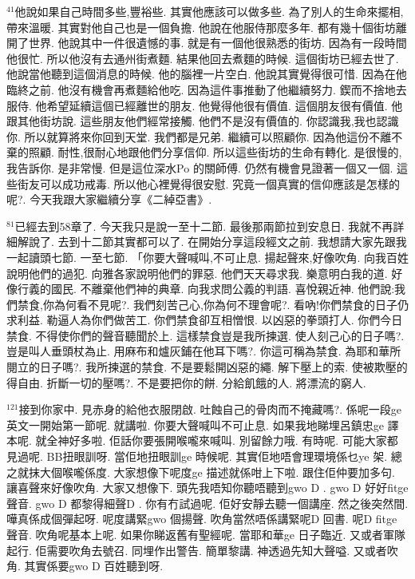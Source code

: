 \documentclass{book}
\begin{document}
$^{41}$他說如果自己時間多些,豐裕些.
其實他應該可以做多些.
為了別人的生命來擺相,帶來溫暖.
其實對他自己也是一個負擔.
他說在他服侍那麼多年.
都有幾十個街坊離開了世界.
他說其中一件很遺憾的事.
就是有一個他很熟悉的街坊.
因為有一段時間他很忙.
所以他沒有去通州街煮麵.
結果他回去煮麵的時候.
這個街坊已經去世了.
他說當他聽到這個消息的時候.
他的腦裡一片空白.
他說其實覺得很可惜.
因為在他臨終之前.
他沒有機會再煮麵給他吃.
因為這件事推動了他繼續努力.
鍥而不捨地去服侍.
他希望延續這個已經離世的朋友.
他覺得他很有價值.
這個朋友很有價值.
他跟其他街坊說.
這些朋友他們經常接觸.
他們不是沒有價值的.
你認識我,我也認識你.
所以就算將來你回到天堂.
我們都是兄弟.
繼續可以照顧你.
因為他這份不離不棄的照顧.
耐性,很耐心地跟他們分享信仰.
所以這些街坊的生命有轉化.
是很慢的,我告訴你.
是非常慢.
但是這位深水Po 的關師傅.
仍然有機會見證著一個又一個.
這些街友可以成功戒毒.
所以他心裡覺得很安慰.
究竟一個真實的信仰應該是怎樣的呢?.
今天我跟大家繼續分享《二綽亞書》.

$^{81}$已經去到58章了.
今天我只是說一至十二節.
最後那兩節拉到安息日.
我就不再詳細解說了.
去到十二節其實都可以了.
在開始分享這段經文之前.
我想請大家先跟我一起讀頭七節.
一至七節.
「你要大聲喊叫,不可止息.
揚起聲來,好像吹角.
向我百姓說明他們的過犯.
向雅各家說明他們的罪惡.
他們天天尋求我.
樂意明白我的道.
好像行義的國民.
不離棄他們神的典章.
向我求問公義的判語.
喜悅親近神.
他們說:我們禁食,你為何看不見呢?.
我們刻苦己心,你為何不理會呢?.
看吶!你們禁食的日子仍求利益.
勒逼人為你們做苦工.
你們禁食卻互相憎恨.
以凶惡的拳頭打人.
你們今日禁食.
不得使你們的聲音聽聞於上.
這樣禁食豈是我所揀選.
使人刻己心的日子嗎?.
豈是叫人垂頭杖為止.
用麻布和爐灰鋪在他耳下嗎?.
你這可稱為禁食.
為耶和華所閱立的日子嗎?.
我所揀選的禁食.
不是要鬆開凶惡的繩.
解下壓上的索.
使被欺壓的得自由.
折斷一切的壓嗎?.
不是要把你的餅.
分給飢餓的人.
將漂流的窮人.

$^{121}$接到你家中.
見赤身的給他衣服閉啟.
吐蝕自己的骨肉而不掩藏嗎?.
係呢一段ge 英文一開始第一節呢.
就講啦.
你要大聲喊叫不可止息.
如果我地睇埋呂鎮忠ge 譯本呢.
就全神好多啦.
佢話你要張開喉嚨來喊叫.
別留餘力哦.
有時呢.
可能大家都見過呢.
BB扭眼訓呀.
當佢地扭眼訓ge 時候呢.
其實佢地唔會理環境係乜ye 架.
總之就抹大個喉嚨係度.
大家想像下呢度ge 描述就係咁上下啦.
跟住佢仲要加多句.
讓喜聲來好像吹角.
大家又想像下.
頭先我唔知你聽唔聽到gwo D .
gwo D 好好fitge 聲音.
gwo D 都黎得細聲D .
你有冇試過呢.
佢好安靜去聽一個講座.
然之後突然間.
嘩真係成個彈起呀.
呢度講緊gwo 個揚聲.
吹角當然唔係講緊呢D 回書.
呢D fitge 聲音.
吹角呢基本上呢.
如果你睇返舊有聖經呢.
當耶和華ge 日子臨近.
又或者軍隊起行.
佢需要吹角去號召.
同埋作出警告.
簡單黎講.
神透過先知大聲嗌.
又或者吹角.
其實係要gwo D 百姓聽到呀.
\end{document}

